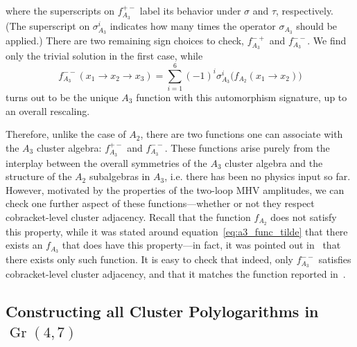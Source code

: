 \documentclass[11pt]{article}
\DeclareMathOperator{\Gr}{Gr}
\begin{document}
where the superscripts on $f_{A_3}^{+-}$ label its behavior under $\sigma$ and $\tau$, respectively. (The superscript on $\sigma_{A_3}^i$ indicates how many times the operator $\sigma_{A_3}$ should be applied.) There are two remaining sign choices to check, $f_{A_3}^{-+}$ and $f_{A_3}^{--}$. We find only the trivial solution in the first case, while		
\begin{equation} \label{eq:fA3mm}
	f_{A_3}^{--}(x_1\to x_2\to x_3) =\sum_{i=1}^6(-1)^i\sigma_{A_3}^i \big(f_{A_2}(x_1\to x_2)\big)
\end{equation}
turns out to be the unique $A_3$ function with this automorphism signature, up to an overall rescaling.

Therefore, unlike the case of $A_2$, there are two functions one can associate with the $A_3$ cluster algebra: $f_{A_3}^{+-}$ and $f_{A_3}^{--}$. These functions arise purely from the interplay between the overall symmetries of the $A_3$ cluster algebra and the structure of the $A_2$ subalgebras in $A_3$, i.e. there has been no physics input so far. However, motivated by the properties of the two-loop MHV amplitudes, we can check one further aspect of these functions---whether or not they respect cobracket-level cluster adjacency. Recall that the function $f_{A_2}$ does not satisfy this property, while it was stated around equation~\eqref{eq:a3_func_tilde} that there exists an $f_{A_3}$ that does have this property---in fact, it was pointed out in~\cite{Golden:2014xqa} that there exists only such function. It is easy to check that indeed, only $f_{A_3}^{--}$ satisfies cobracket-level cluster adjacency, and that it matches the function reported in~\cite{Golden:2014xqa}. 

\subsection{Constructing all Cluster Polylogarithms in $\Gr(4,7)$} \label{sec:all_nonclassical_polylogs_gr47}
\end{document}
